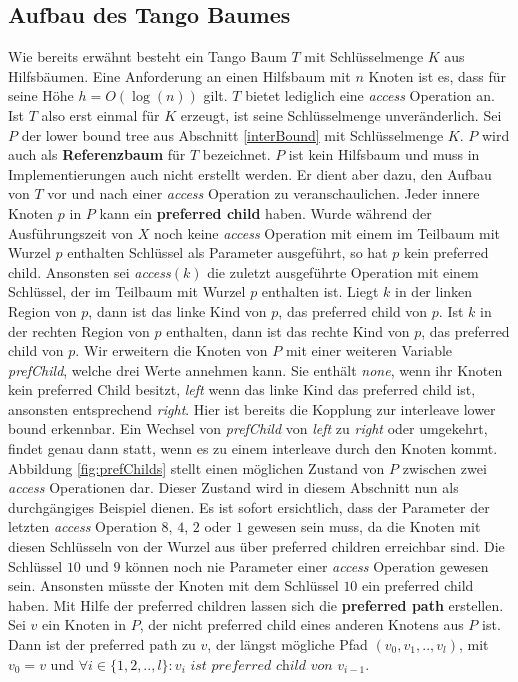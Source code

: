 \documentclass[a4paper,12pt]{article}
\begin{document}
\subsection{Aufbau des Tango Baumes} \label{aufbauDesTango}
Wie bereits erwähnt besteht ein Tango Baum $T$ mit Schlüsselmenge $K$ aus Hilfsbäumen. Eine Anforderung an einen Hilfsbaum mit $n$ Knoten ist es, dass für seine Höhe $h = O\left(\log\left( n\right)\right)$ gilt. $T$ bietet lediglich eine \textit{access} Operation an. Ist $T$ also erst einmal für $K$ erzeugt, ist seine Schlüsselmenge unveränderlich. Sei $P$ der lower bound tree aus Abschnitt \ref{interBound} mit Schlüsselmenge $K$. $P$ wird auch als \textbf{Referenzbaum} für $T$ bezeichnet. $P$ ist kein Hilfsbaum und muss in Implementierungen auch nicht erstellt werden. Er dient aber dazu, den Aufbau von $T$ vor und nach einer \textit{access} Operation zu veranschaulichen. Jeder innere Knoten $p$ in $P$ kann ein \textbf{preferred child} haben.  Wurde während der Ausführungszeit von $X$ noch keine \textit{access} Operation mit einem im Teilbaum mit Wurzel $p$ enthalten Schlüssel als Parameter ausgeführt, so hat $p$ kein preferred child. Ansonsten sei \textit{access}$\left(k\right)$ die zuletzt ausgeführte Operation mit einem Schlüssel, der im Teilbaum mit Wurzel $p$ enthalten ist. Liegt $k$ in der linken Region von $p$, dann ist das linke Kind von $p$, das preferred child von $p$. Ist $k$ in der rechten Region von $p$ enthalten, dann ist das rechte Kind von $p$, das preferred child von $p$. Wir erweitern die Knoten von $P$ mit einer weiteren Variable \textit{prefChild}, welche drei Werte annehmen kann. Sie enthält \textit{none}, wenn ihr Knoten kein preferred Child besitzt, \textit{left} wenn das linke Kind das preferred child ist, ansonsten entsprechend \textit{right}. Hier ist bereits die Kopplung zur interleave lower bound erkennbar. Ein Wechsel von \textit{prefChild}  von \textit{left} zu \textit{right} oder umgekehrt, findet genau dann statt, wenn es zu einem interleave durch den Knoten kommt. Abbildung \ref{fig:prefChilds} stellt einen möglichen Zustand von $P$ zwischen zwei \textit{access} Operationen dar. Dieser Zustand wird in diesem Abschnitt nun als durchgängiges Beispiel dienen. Es ist sofort ersichtlich, dass der Parameter der letzten \textit{access} Operation $8$, $4$, $2$ oder $1$ gewesen sein muss, da die Knoten mit diesen Schlüsseln von der Wurzel aus über preferred children erreichbar sind. Die Schlüssel $10$ und $9$ können noch nie Parameter einer \textit{access} Operation gewesen sein. Ansonsten müsste der Knoten mit dem Schlüssel $10$ ein preferred child haben. Mit Hilfe der preferred children lassen sich die \textbf{preferred path} erstellen. Sei $v$ ein Knoten in $P$, der nicht preferred child eines anderen Knotens aus $P$ ist. Dann ist der preferred path zu $v$, der längst mögliche Pfad $\left(v_0, v_1,..,v_l\right)$, mit $v_0 = v$ und $\forall i \in \{1,2,..,l\} \colon v_i \textit{ ist preferred child von }v_{i-1   }$.  
\end{document}
